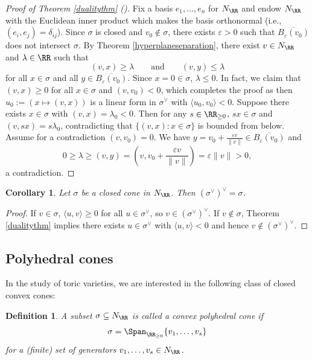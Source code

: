 \documentclass[12pt]{amsart}
\theoremstyle{plain}
\newtheorem{definition}[theorem]{Definition}
\newtheorem{corollary}[theorem]{Corollary}
\begin{document}
\begin{proof}[Proof of Theorem \ref{dualitythm} \textup{(\cite[Example 2.20]{BV04})}]
Fix a basis $e_1, \ldots, e_n$ for $N_\RR$ and endow $N_\RR$ with the Euclidean inner product which makes the basis orthonormal (i.e., $(e_i, e_j) = \delta_{ij}$).
Since $\sigma$ is closed and $v_0 \notin \sigma$, there exists $\varepsilon > 0$ such that $\overline{B_\varepsilon(v_0)}$ does not intersect $\sigma$.
By Theorem \ref{hyperplaneseparation}, there exist $v \in N_\RR$ and $\lambda \in \RR$ such that 
$$(v, x) \ge \lambda \qquad \text{and} \qquad (v, y) \le \lambda$$
for all $x \in \sigma$ and all $y \in \overline{B_\varepsilon(v_0)}$.
Since $x = 0 \in \sigma$, $\lambda \le 0$.
In fact, we claim that $(v, x) \ge 0$ for all $x \in \sigma$ and $(v, v_0) < 0$,
which completes the proof as then $u_0 := (x \mapsto (v, x))$ is a linear form in $\sigma^\vee$ with $\langle u_0, v_0 \rangle < 0$.
Suppose there exists $x \in \sigma$ with $(v, x) = \lambda_0 < 0$.
Then for any $s \in \RR_{\ge 0}$, $s x \in \sigma $ and $(v, s x) = s \lambda_0$, contradicting that $\{(v, x) : x \in \sigma\}$ is bounded from below.
Assume for a contradiction $(v, v_0) = 0$.
We have $y = v_0 + \frac{\varepsilon v}{\|v\|} \in \overline{B_\varepsilon(v_0)}$ and
$$0 \ge \lambda \ge (v, y) = (v, v_0 + \frac{\varepsilon v}{\|v\|}) = \varepsilon \|v\| > 0,$$
a contradiction.
\end{proof}

\begin{corollary}
Let $\sigma$ be a closed cone in $N_\RR$.
Then $(\sigma^\vee)^\vee = \sigma$.
\end{corollary}
\begin{proof}
If $v \in \sigma$, $\langle u, v\rangle \ge 0$ for all $u \in \sigma^\vee$, so $v \in (\sigma^\vee)^\vee$.
If $v \notin \sigma$, Theorem \ref{dualitythm} implies there exists $u \in \sigma^\vee$ with $\langle u, v \rangle < 0$ and hence $v \notin (\sigma^\vee)^\vee$.
\end{proof}

\subsection{Polyhedral cones}\label{polyhedralcones}
In the study of toric varieties, we are interested in the following class of closed convex cones:

\begin{definition}\label{convexpolyhedraldef}
A subset $\sigma \subseteq N_\RR$ is called a convex polyhedral cone if
$$\sigma = \Span_{\RR_{\ge 0}} \{v_1, \ldots, v_s\}$$
for a (finite) set of generators $v_1, \ldots, v_s \in N_\RR$.
\end{definition}
\end{document}
